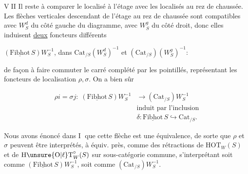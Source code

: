 \textcircled{VII}  Il reste à comparer le localisé à l'étage avec les localisés  au rez de chaussée. Les flèches verticales  descendant de l'étage au rez de chaussée sont compatibles avec $W_S^d$ du côté gauche du diagramme, avec $W_S^g$ du côté droit, donc elles induisent  \uline{deux} foncteurs différents

  $(\underline{\mathrm{Fibhot}}\,S)W_S^{-1}$, dans $\mathrm{Cat}_{/S}(W_S^d)^{-1}$ et $(\mathrm{Cat}_{/S})(W_S^g)^{-1}$:


de façon à faire commuter le carré complété par les pointillés, représentant les foncteurs de localisation $\rho,\sigma$. On a bien sûr 

\[
\begin{aligned}
\rho i=\sigma j:\;(\underline{\mathrm{Fibhot}}\,S)W_S^{-1}&\longrightarrow(\mathrm{Cat}_{/S})W_S^{-1}\\
&\text{induit par l'inclusion}\\
&\delta:\underline{\mathrm{Fibhot}}\,S\hookrightarrow\mathrm{Cat}_{/S}.
\end{aligned}\tag*{(*)}
\]

Nous avons énoncé  dans \textcircled{I} que cette flèche est une équivalence, de sorte que $\rho$ et $\sigma$ peuvent être interprétés, à équiv.  près, comme des rétractions de $\mathrm{HOT}_{W}(S)$ et de $\mathrm{H\unsure{O|\ell}T}_{W}^{\circ}(S)$ sur  sous-catégorie commune, s'interprétant soit comme $(\underline{\mathrm{Fibhot}}\,S)W_S^{-1}$, soit comme $(\mathrm{Cat}_{/S})W_S^{-1}$.

